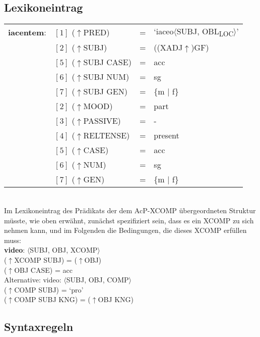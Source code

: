 \documentclass[12pt,a4paper]{article}
\begin{document}
\subsection{Lexikoneintrag}

\begin{singlespace}
\begin{tabular}{ l  l  l  l  } 
\textbf{iacentem}: & $[1]$ \: ($\uparrow$PRED) & = & `iaceo$\langle$SUBJ, OBL\textsubscript{LOC}$\rangle$'\\
$\qquad$ & $[2]$ \:  ($\uparrow$SUBJ) & = & ((XADJ$\uparrow$)GF)\\
$\qquad$ & $[5]$ \: ($\uparrow$SUBJ CASE) & = & acc \\
$\qquad$ & $[6]$ \: ($\uparrow$SUBJ NUM) & = & sg \\
$\qquad$ & $[7]$ \: ($\uparrow$SUBJ GEN) & = & \{m $\mid$ f\} \\
$\qquad$ & $[2]$ \: ($\uparrow$MOOD) & = & part\\
$\qquad$ & $[3]$ \: ($\uparrow$PASSIVE) & = & - \\
$\qquad$ & $[4]$ \: ($\uparrow$RELTENSE) & = & present \\
$\qquad$ & $[5]$ \: ($\uparrow$CASE) & = & acc \\
$\qquad$ & $[6]$ \: ($\uparrow$NUM) & = & sg \\
$\qquad$ & $[7]$ \: ($\uparrow$GEN) & = & \{m $\mid$ f\} \\
\end{tabular}\\
\newline
Im Lexikoneintrag des Prädikats der dem AcP-XCOMP übergeordneten Struktur müsste, wie oben erwähnt, zunächst spezifiziert sein, dass es ein XCOMP zu sich nehmen kann, und im Folgenden die Bedingungen, die dieses XCOMP erfüllen muss:\\
\textbf{video}: $\langle$SUBJ, OBJ, XCOMP$\rangle$\\
($\uparrow$XCOMP SUBJ) = ($\uparrow$OBJ)\\
($\uparrow$OBJ CASE) = acc\\

Alternative:
video: $\langle$SUBJ, OBJ, COMP$\rangle$\\
($\uparrow$COMP SUBJ) = `pro'\\
($\uparrow$COMP SUBJ KNG) = ($\uparrow$OBJ KNG)\\

\end{singlespace}

\subsection{Syntaxregeln}
\end{document}
